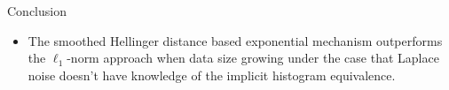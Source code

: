 \documentclass[final,hyperref={pdfpagelabels=false}]{beamer}
\begin{document}
\begin{frame}[t]
\begin{columns}[t]
\begin{column}{.485\textwidth}
\begin{block}{Conclusion}
\begin{itemize}
  \item The smoothed Hellinger distance based exponential mechanism outperforms the $\ell_1$-norm approach when data size growing under the case that Laplace noise doesn't have knowledge of the implicit histogram equivalence.
    


\end{itemize}
\end{block}














\end{column}
\end{columns}
\end{frame}
\end{document}
